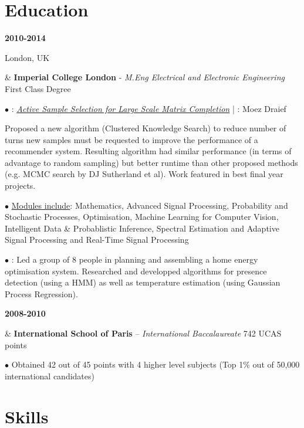 \documentclass[a4paper,10pt,oneside]{article}
\begin{document}
\section*{Education}
\begin{body}

{\textbf{2010-2014} \par London, UK} & \textbf{Imperial College London} - \textit{M.Eng Electrical and Electronic Engineering} \hfill First Class Degree 



$\bullet$ \underline{}: \href{http://sg3510.github.io/al_proj/Report/thesis.pdf}{\textit{Active Sample Selection for Large Scale Matrix Completion}} | \underline{}: Moez Draief

Proposed a new algorithm (Clustered Knowledge Search) to reduce number of turns new samples must be requested to improve the performance of a recommender system. Resulting algorithm had similar performance (in terms of advantage to random sampling) but better runtime than other proposed methods (e.g. MCMC search by DJ Sutherland et al). Work featured in best final year projects.

$\bullet$ \underline{Modules include}: Mathematics, Advanced Signal Processing, Probability and Stochastic Processes, Optimisation, Machine Learning for Computer Vision, Intelligent Data \& Probablistic Inference, Spectral Estimation and Adaptive Signal Processing and Real-Time Signal Processing



$\bullet$ \underline{}: Led a group of 8 people in planning and assembling a home energy optimisation system. Researched and developped algorithms for presence detection (using a HMM) as well as temperature estimation (using Gaussian Process Regression).
\\ 
{\textbf{2008-2010} \par {} } & \textbf{International School of Paris} – \textit{International Baccalaureate} \hfill 742 UCAS points

$\bullet$ Obtained 42 out of 45 points with 4 higher level subjects (Top 1\% out of 50,000 international candidates)

\end{body}

\section*{Skills}
\end{document}
